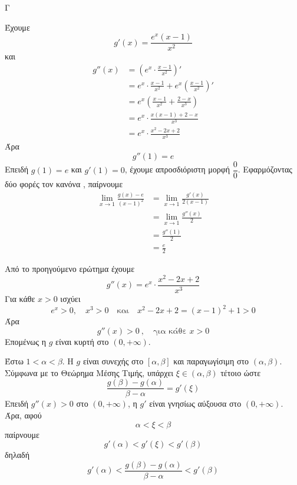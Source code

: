 \begin{thema}{Γ}
\begin{erwthma}
\item Έχουμε
\[g'(x)=\frac{e^x(x-1)}{x^2}\]
και
\begin{align*}
g''(x)
&=\left(e^x\cdot\frac{x-1}{x^2}\right)'\\
&=e^x\cdot\frac{x-1}{x^2}+e^x\left(\frac{x-1}{x^2}\right)'\\
&=e^x\left(\frac{x-1}{x^2}+\frac{2-x}{x^3}\right)\\
&=e^x\cdot\frac{x(x-1)+2-x}{x^3}\\
&=e^x\cdot\frac{x^2-2x+2}{x^3}
\end{align*}
Άρα
\[g''(1)=e\]
Επειδή $g(1)=e$ και $g'(1)=0$, έχουμε απροσδιόριστη μορφή $\dfrac{0}{0}$.
Εφαρμόζοντας δύο φορές τον κανόνα , παίρνουμε
\begin{align*}
\lim\limits_{x\to 1}\frac{g(x)-e}{(x-1)^2}
&=\lim\limits_{x\to 1}\frac{g'(x)}{2(x-1)}\\
&=\lim\limits_{x\to 1}\frac{g''(x)}{2}\\
&=\frac{g''(1)}{2}\\
&=\frac{e}{2}
\end{align*}

\item Από το προηγούμενο ερώτημα έχουμε
\[g''(x)=e^x\cdot\frac{x^2-2x+2}{x^3}\]
Για κάθε $x>0$ ισχύει
\[e^x>0,\quad x^3>0\quad \text{και}\quad x^2-2x+2=(x-1)^2+1>0\]
Άρα
\[g''(x)>0\ ,\quad \text{για κάθε }x>0\]
Επομένως η $g$ είναι κυρτή στο $(0,+\infty)$.

Έστω $1<\alpha<\beta$.
Η $g$ είναι συνεχής στο $[\alpha,\beta]$ και παραγωγίσιμη στο $(\alpha,\beta)$.
Σύμφωνα με το Θεώρημα Μέσης Τιμής, υπάρχει $\xi\in(\alpha,\beta)$ τέτοιο ώστε
\[\frac{g(\beta)-g(\alpha)}{\beta-\alpha}=g'(\xi)\]
Επειδή $g''(x)>0$ στο $(0,+\infty)$, η $g'$ είναι γνησίως αύξουσα στο $(0,+\infty)$.
Άρα, αφού
\[\alpha<\xi<\beta\]
παίρνουμε
\[g'(\alpha)<g'(\xi)<g'(\beta)\]
δηλαδή
\[g'(\alpha)<\frac{g(\beta)-g(\alpha)}{\beta-\alpha}<g'(\beta)\]
\end{erwthma}
\end{thema}

